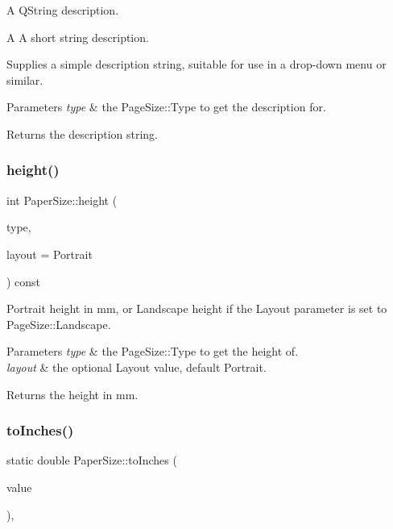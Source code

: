 A {\ttfamily Q\+String} description. 

A {\ttfamily A} short string description.

Supplies a simple description string, suitable for use in a drop-\/down menu or similar.


\begin{DoxyParams}{Parameters}
{\em type} & the Page\+Size\+::\+Type to get the description for. \\
\hline
\end{DoxyParams}
\begin{DoxyReturn}{Returns}
the description string. 
\end{DoxyReturn}
\mbox{\label{classPaperSize_a185becbda27217b5df2bccc27f29bf4b}} 
\subsubsection{\texorpdfstring{height()}{height()}}
{\footnotesize\ttfamily int Paper\+Size\+::height (\begin{DoxyParamCaption}\item[{const \mbox{\hyperlink{classPaperSize_a0c3744aab15a171ac1681788f7169ed8}{Type}}}]{type,  }\item[{Layout}]{layout = {\ttfamily Portrait} }\end{DoxyParamCaption}) const}



Portrait height in mm, or Landscape height if the {\ttfamily Layout} parameter is set to {\ttfamily Page\+Size\+::\+Landscape}. 


\begin{DoxyParams}{Parameters}
{\em type} & the Page\+Size\+::\+Type to get the height of. \\
\hline
{\em layout} & the optional Layout value, default Portrait. \\
\hline
\end{DoxyParams}
\begin{DoxyReturn}{Returns}
the height in mm. 
\end{DoxyReturn}
\mbox{\label{classPaperSize_ac4b94da1c955bcf6b733d99f3b3a416d}} 
\subsubsection{\texorpdfstring{to\+Inches()}{toInches()}}
{\footnotesize\ttfamily static double Paper\+Size\+::to\+Inches (\begin{DoxyParamCaption}\item[{int}]{value }\end{DoxyParamCaption})\hspace{0.3cm}{\ttfamily [inline]}, {\ttfamily [static]}}



